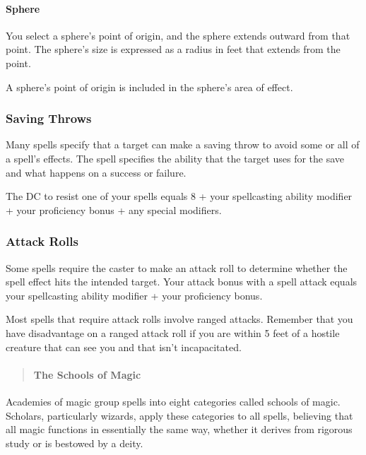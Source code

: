 \documentclass[
]{article}
\begin{document}
\hypertarget{sphere}{%
\paragraph{Sphere}\label{sphere}}

You select a sphere's point of origin, and the sphere extends outward
from that point. The sphere's size is expressed as a radius in feet that
extends from the point.

A sphere's point of origin is included in the sphere's area of effect.

\hypertarget{saving-throws}{%
\subsubsection{Saving Throws}\label{saving-throws}}

Many spells specify that a target can make a saving throw to avoid some
or all of a spell's effects. The spell specifies the ability that the
target uses for the save and what happens on a success or failure.

The DC to resist one of your spells equals 8 + your spellcasting ability
modifier + your proficiency bonus + any special modifiers.

\hypertarget{attack-rolls}{%
\subsubsection{Attack Rolls}\label{attack-rolls}}

Some spells require the caster to make an attack roll to determine
whether the spell effect hits the intended target. Your attack bonus
with a spell attack equals your spellcasting ability modifier + your
proficiency bonus.

Most spells that require attack rolls involve ranged attacks. Remember
that you have disadvantage on a ranged attack roll if you are within 5
feet of a hostile creature that can see you and that isn't
incapacitated.

\begin{quote}
\mbox{}%
\hypertarget{the-schools-of-magic}{%
\paragraph{The Schools of Magic}\label{the-schools-of-magic}}
\end{quote}

Academies of magic group spells into eight categories called schools of
magic. Scholars, particularly wizards, apply these categories to all
spells, believing that all magic functions in essentially the same way,
whether it derives from rigorous study or is bestowed by a deity.
\end{document}
